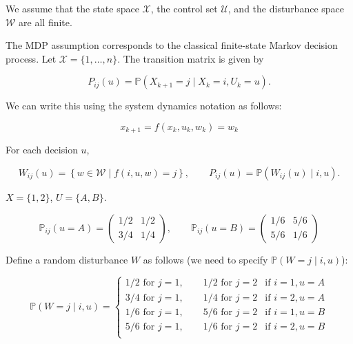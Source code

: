 \begin{definition}

We assume that the state space \(\mathcal{X}\), the control set \(\mathcal{U}\), and the disturbance space \(\mathcal{W}\) are all finite.



\end{definition}

The MDP assumption corresponds to the classical finite-state Markov decision process. Let \(\mathcal{X} = \{1, \ldots, n\}\). The transition matrix is given by

\[
P_{ij} (u) = \mathbb{P}(X_{k+1} = j \mid X_k = i, U_k = u ).
\]

We can write this using the system dynamics notation as follows:

\[
x_{k+1} = f(x_k, u_k, w_k) = w_k
\]

For each decision \(u\),

\[
W_{ij}(u) = \left\{ w \in \mathcal{W} \mid f(i, u ,w ) = j\right\}, \qquad P_{ij}(u) = \mathbb{P}(W_{ij}(u) \mid i, u).
\]

\begin{example}

\(X = \{1,2\}\), \(U = \{A, B\}\). 

\[
\mathbb{P}_{ij}(u = A) = \begin{pmatrix}
1/2 & 1/2 \\
3/4 & 1/4
\end{pmatrix}, \qquad  \mathbb{P}_{ij}(u = B) = \begin{pmatrix}
1/6 & 5/6 \\
5/6 & 1/6
\end{pmatrix}
\]

Define a random disturbance \(W\) as follows (we need to specify \(\mathbb{P}(W = j \mid i , u)\)):

\[
\mathbb{P}(W = j \mid i, u) = \begin{cases}
 1/2  \text{ for } j=1, \qquad 1/2 \text{ for } j = 2   & \text{if } i = 1, u = A \\
 3/4 \text{ for } j=1, \qquad 1/4 \text{ for } j = 2   & \text{if } i = 2, u = A \\
  1/6 \text{ for } j=1, \qquad 5/6 \text{ for } j = 2   & \text{if } i = 1, u = B \\
 5/6 \text{ for } j=1,\qquad  1/6 \text{ for } j = 2   & \text{if } i = 2, u = B \\
\end{cases}
\]

\end{example}

